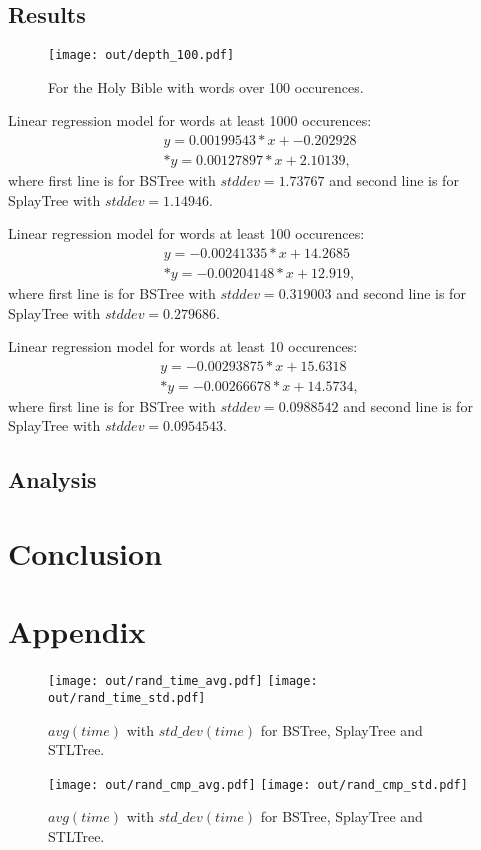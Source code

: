 \documentclass[12pt,a4paper]{article}
\begin{document}
\subsection{Results} 

\begin{figure}[h]
  \centering
  \texttt{[image: out/depth\_100.pdf]}
  \caption{For the Holy Bible with words over 100 occurences.}
  \label{fig:depth_to_freq}
\end{figure}

Linear regression model for words at least 1000 occurences:  
\begin{align} 
y = 0.00199543*x + -0.202928 \\*
y = 0.00127897*x + 2.10139, 
\end{align} 
where first line is for BSTree with $stddev=1.73767$ and second line is for SplayTree with $stddev=1.14946$. 

Linear regression model for words at least 100 occurences:  
\begin{align} 
y = -0.00241335*x + 14.2685 \\*
y = -0.00204148*x + 12.919, 
\end{align} 
where first line is for BSTree with $stddev=0.319003$ and second line is for SplayTree with $stddev=0.279686$. 

Linear regression model for words at least 10 occurences:  
\begin{align} 
y = -0.00293875*x + 15.6318 \\*
y = -0.00266678*x + 14.5734, 
\end{align} 
where first line is for BSTree with $stddev=0.0988542$ and second line is for SplayTree with $stddev=0.0954543$. 

\subsection{Analysis} 

\section*{Conclusion} 

\newpage
\section*{Appendix}

\begin{figure}[b]
  \centering
  \texttt{[image: out/rand\_time\_avg.pdf]}
  \texttt{[image: out/rand\_time\_std.pdf]}
  \caption{$avg(time)$ with $std\_dev(time)$ for BSTree, SplayTree and STLTree.}
  \label{fig:avg_std_time_plots}
\end{figure}

\begin{figure}[b]
  \centering
  \texttt{[image: out/rand\_cmp\_avg.pdf]}
  \texttt{[image: out/rand\_cmp\_std.pdf]}
  \caption{$avg(time)$ with $std\_dev(time)$ for BSTree, SplayTree and STLTree.}
  \label{fig:avg_std_cmp_plots}
\end{figure}
\end{document}

